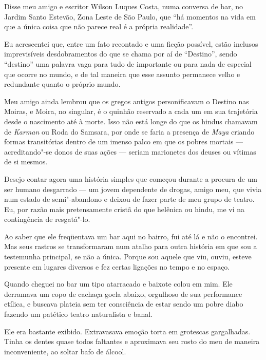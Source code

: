  

Disse meu amigo e escritor Wilson Luques Costa, numa conversa de bar, no
Jardim Santo Estevão, Zona Leste de São Paulo, que ``há momentos na vida
em que a única coisa que não parece real é a própria realidade''.

Eu acrescentei que, entre um fato recontado e uma ficção possível, estão
inclusos imprevisíveis desdobramentos do que se chama por aí de
``Destino'', sendo ``destino'' uma palavra vaga para tudo de importante
ou para nada de especial que ocorre no mundo, e de tal maneira que esse
assunto permanece velho e redundante quanto o próprio mundo.

Meu amigo ainda lembrou que os gregos antigos personificavam o Destino
nas Moiras, e Moira, no singular, é o quinhão reservado a cada um em sua
trajetória desde o nascimento até à morte. Isso não está longe do que os
hindus chamavam de \emph{Karman} ou Roda do Samsara, por onde se faria a
presença de \emph{Maya} criando formas transitórias dentro de um imenso
palco em que os pobres mortais --- acreditando"-se donos de suas ações
--- seriam marionetes dos deuses ou vítimas de si mesmos.

\asterisc{}

Desejo contar agora uma história simples que começou durante a procura de
um ser humano desgarrado --- um jovem dependente de drogas, amigo meu,
que vivia num estado de semi"-abandono e deixou de fazer parte de meu
grupo de teatro. Eu, por razão mais pretensamente cristã do que helênica
ou hindu, me vi na contingência de resgatá"-lo.

Ao saber que ele freqüentava um bar aqui no bairro, fui até lá e não o
encontrei. Mas seus rastros se transformaram num atalho para outra
história em que sou a testemunha principal, se não a única. Porque sou
aquele que viu, ouviu, esteve presente em lugares diversos e fez certas
ligações no tempo e no espaço.

\asterisc{}

Quando cheguei no bar um tipo atarracado e baixote colou em mim. Ele
derramava um copo de cachaça goela abaixo, orgulhoso de sua performance
etílica, e buscava plateia sem ter consciência de estar sendo um pobre
diabo fazendo um patético teatro naturalista e banal.

Ele era bastante exibido. Extravasava emoção torta em grotescas
gargalhadas. Tinha os dentes quase todos faltantes e aproximava seu
rosto do meu de maneira inconveniente, ao soltar bafo de álcool.

